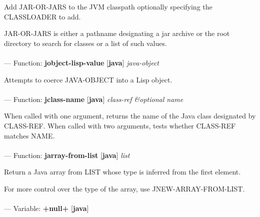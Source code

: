 \begin{adjustwidth}{5em}{5em}
Add JAR-OR-JARS to the JVM classpath optionally specifying the CLASSLOADER to add.

JAR-OR-JARS is either a pathname designating a jar archive or the root
directory to search for classes or a list of such values.
\end{adjustwidth}

\paragraph{}
\label{JAVA:JOBJECT-LISP-VALUE}
--- Function: \textbf{jobject-lisp-value} [\textbf{java}] \textit{java-object}

\begin{adjustwidth}{5em}{5em}
Attempts to coerce JAVA-OBJECT into a Lisp object.
\end{adjustwidth}

\paragraph{}
\label{JAVA:JCLASS-NAME}
--- Function: \textbf{jclass-name} [\textbf{java}] \textit{class-ref \&optional name}

\begin{adjustwidth}{5em}{5em}
When called with one argument, returns the name of the Java class
  designated by CLASS-REF. When called with two arguments, tests
  whether CLASS-REF matches NAME.
\end{adjustwidth}

\paragraph{}
\label{JAVA:JARRAY-FROM-LIST}
--- Function: \textbf{jarray-from-list} [\textbf{java}] \textit{list}

\begin{adjustwidth}{5em}{5em}
Return a Java array from LIST whose type is inferred from the first element.

For more control over the type of the array, use JNEW-ARRAY-FROM-LIST.
\end{adjustwidth}

\paragraph{}
\label{JAVA:+NULL+}
--- Variable: \textbf{+null+} [\textbf{java}] \textit{}


